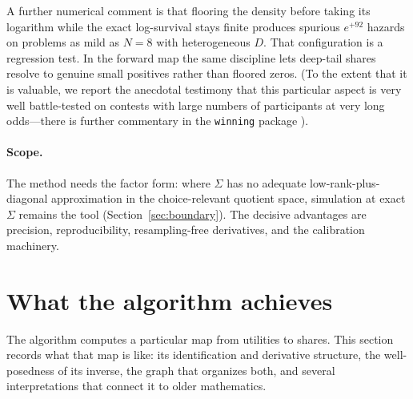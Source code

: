 \documentclass[12pt]{article}
\theoremstyle{remark}
\begin{document}
A further numerical comment is that flooring the density before taking its logarithm while the exact
log-survival stays finite produces spurious $e^{+92}$ hazards on problems as
mild as $N = 8$ with heterogeneous $D$.  That configuration is a regression
test. In the forward map the same discipline lets deep-tail shares resolve to
genuine small positives rather than floored zeros. (To the extent that it is valuable, we
report the anecdotal testimony that this particular aspect is very well battle-tested
on contests with large numbers of participants at very long odds---there is further commentary
in the \texttt{winning} package \citep{winningpkg}). 

\paragraph{Scope.} The method needs the factor form: where $\Sigma$ has no
adequate low-rank-plus-diagonal approximation in the choice-relevant quotient
space, simulation at exact $\Sigma$ remains the tool
(Section~\ref{sec:boundary}). The decisive advantages are precision,
reproducibility, resampling-free derivatives, and the calibration
machinery.

\section{What the algorithm achieves}\label{sec:theory}

The algorithm computes a particular map from utilities to shares. This
section records what that map is like: its identification and
derivative structure, the well-posedness of its inverse, the graph that
organizes both, and several interpretations that connect it to older
mathematics.
\end{document}

